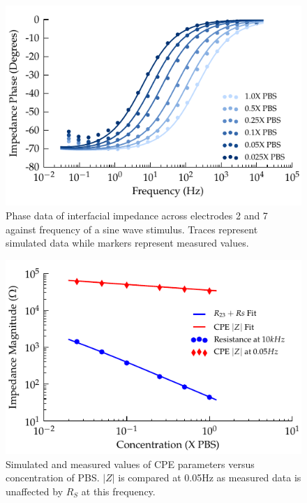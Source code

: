 \documentclass[journal, a4paper]{IEEEtran}
\begin{document}
\begin{figure}
    \begin{center}
        \includegraphics{graphics/displacement_impedanceVsFrequency_phase}
    \end{center}
    \caption{Phase data of interfacial impedance across electrodes 2 and 7 against frequency of a sine wave stimulus. Traces represent simulated data while markers represent measured values.}
    \label{fig:CPE_Phase}
\end{figure}

\begin{figure}
    \begin{center}
        \includegraphics{graphics/scalingFactors_Displacement_IEEE}
    \end{center}
    \caption{Simulated and measured values of CPE parameters versus concentration of PBS. $|Z|$ is compared at 0.05\thinspace Hz as measured data is unaffected by $R_{S}$ at this frequency.}
    \label{fig:CPE_Scaling}
\end{figure}
\end{document}
